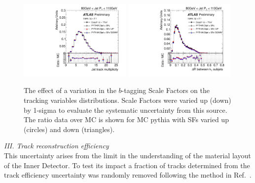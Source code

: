 \begin{figure}[tp]
\centering
\includegraphics[width=0.49\textwidth]{FIGS/systematics/BTagCalib_DataVarNtrkPT080.pdf}
\includegraphics[width=0.49\textwidth]{FIGS/systematics/BTagCalib_DataVarDRktaxisPT080.pdf}
\caption{The effect of a variation in the $b$-tagging Scale Factors on the tracking variables distributions. Scale Factors were varied up (down) by 1-sigma to evaluate the systematic uncertainty from this source. The ratio data over MC is shown for MC {\sc pythia} with SFs varied up (circles) and down (triangles).}
\label{fig:btaggingSFs}
\end{figure}


%

\vspace{3mm}
{ \em III. Track reconstruction efficiency}
\\[3mm]
This uncertainty arises from the limit in the understanding of the material layout of the Inner Detector. To test its impact a fraction of tracks determined from the track efficiency uncertainty was randomly removed following the method in Ref.~\cite{JetMassNote}.%

